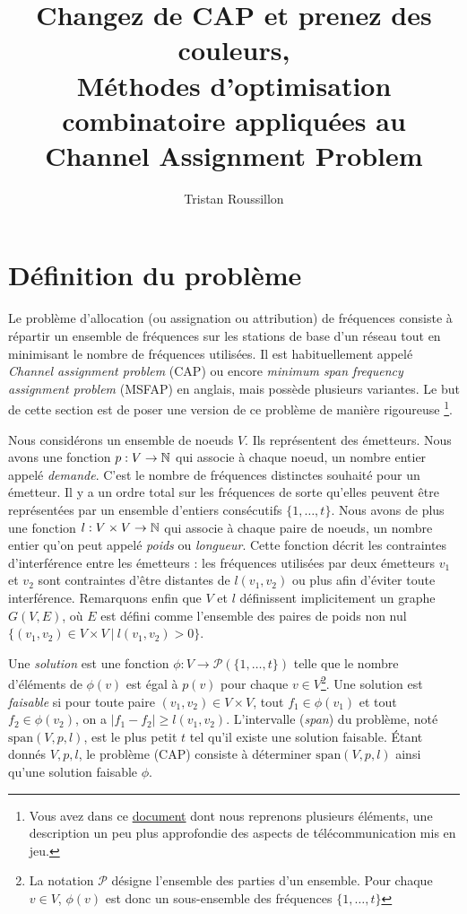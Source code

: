 \documentclass[a4paper,francais]{article}
\title{Changez de CAP et prenez des couleurs, \\
  Méthodes d'optimisation combinatoire appliquées au Channel Assignment Problem}
\author{Tristan Roussillon}
\newcommand{\N}{{\ensuremath\mathbb{N}}}
\theoremstyle{definition}
\begin{document}
\maketitle


\section{Définition du problème}
\label{sec:CAP}

Le problème d'allocation (ou assignation ou attribution) de fréquences consiste
à répartir un ensemble de fréquences sur les stations de base d'un réseau
tout en minimisant le nombre de fréquences utilisées. Il est habituellement
appelé \emph{Channel assignment problem} (CAP) ou encore \emph{minimum span frequency
  assignment problem} (MSFAP) en anglais, mais possède plusieurs variantes.
Le but de cette section est de poser une version de ce problème de manière rigoureuse
\footnote{Vous avez dans ce \href{http://www-sop.inria.fr/members/Frederic.Havet/Cours/channel.pdf}{document}
  dont nous reprenons plusieurs éléments, une description un peu plus approfondie
  des aspects de télécommunication mis en jeu.}.

Nous considérons un ensemble de noeuds $V$. Ils représentent des émetteurs.
Nous avons une fonction $p : V \rightarrow \N$ qui associe à chaque noeud, un nombre
entier appelé \emph{demande}. C'est le nombre de fréquences distinctes souhaité pour
un émetteur. Il y a un ordre total sur les fréquences de sorte qu'elles peuvent être
représentées par un ensemble d'entiers consécutifs $\{1, \dots, t\}$.
Nous avons de plus une fonction $l : V \times V \rightarrow \N$
qui associe à chaque paire de noeuds, un nombre entier qu'on peut appelé \emph{poids}
ou \emph{longueur}. 
Cette fonction décrit les contraintes d'interférence entre les émetteurs :
les fréquences utilisées par deux émetteurs $v_1$ et $v_2$ sont contraintes
d'être distantes de $l(v_1,v_2)$ ou plus afin d'éviter toute interférence.
Remarquons enfin que $V$ et $l$ définissent implicitement un graphe $G(V,E)$, 
où $E$ est défini comme l'ensemble des paires de poids non nul
$\{ (v_1,v_2) \in V \times V \ | \ l(v_1,v_2) > 0 \}$.  
 
Une \emph{solution} est une fonction $\phi : V \rightarrow \mathcal{P}(\{1,\dots,t\})$ telle que
le nombre d'éléments de $\phi(v)$ est égal à $p(v)$ pour chaque $v \in V$\footnote{La
  notation $\mathcal{P}$ désigne l'ensemble des parties d'un ensemble. Pour
  chaque $v \in V$, $\phi(v)$ est donc un sous-ensemble des fréquences $\{1,\dots,t\}$}.
Une solution est \emph{faisable} si pour toute paire $(v_1,v_2) \in V \times V$,
tout $f_1 \in \phi(v_1)$ et tout $f_2 \in \phi(v_2)$, on a $|f_1 - f_2| \geq l(v_1,v_2)$.
L'intervalle (\emph{span}) du problème, noté $\text{span}(V, p, l)$, est le plus petit $t$
tel qu'il existe une solution faisable.
\'Etant donnés $V, p, l$, le problème (CAP) consiste à déterminer $\text{span}(V, p, l)$
ainsi qu'une solution faisable $\phi$.
\end{document}
